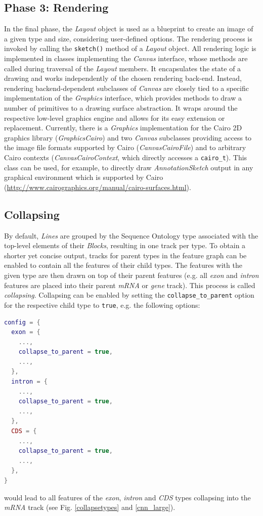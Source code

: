\documentclass[a4paper]{scrreprt}
\begin{document}
\subsection{Phase 3: Rendering}
In the final phase, the \emph{Layout} object is used as a blueprint to create an image of a given type and size, considering user-defined options. The rendering process is invoked by calling the \texttt{sketch()} method of a \emph{Layout} object. All rendering logic is implemented in classes implementing the \emph{Canvas} interface, whose methods are called during traversal of the \emph{Layout} members. It encapsulates the state of a drawing and works independently of the chosen rendering back-end. Instead, rendering backend-dependent subclasses of \emph{Canvas} are closely tied to a specific implementation of the \emph{Graphics} interface, which provides methods to draw a number of primitives to a drawing surface abstraction. It wraps around the respective low-level graphics engine and allows for its easy extension or replacement.
 Currently, there is a \emph{Graphics} implementation for the Cairo 2D graphics library (\emph{GraphicsCairo}) and two \emph{Canvas} subclasses providing access to the image file formats supported by Cairo (\emph{CanvasCairoFile}) and to arbitrary Cairo contexts (\emph{CanvasCairoContext}, which directly accesses a \texttt{cairo\_t}). This class can be used, for example, to directly draw \emph{AnnotationSketch} output in any graphical environment which is supported by Cairo (\url{http://www.cairographics.org/manual/cairo-surfaces.html}).

\subsection{Collapsing}
By default, \emph{Lines} are grouped by the Sequence Ontology type associated with the top-level elements of their \emph{Blocks}, resulting in one track per type.
To obtain a shorter yet concise output, tracks for parent types in the feature graph can be enabled to contain all the features of their child types. The features with the given type are then drawn on top of their parent features (e.g. all \emph{exon} and \emph{intron} features are placed into their parent \emph{mRNA} or \emph{gene} track). This process is called \emph{collapsing}. Collapsing can be enabled by setting the \texttt{collapse\_to\_parent} option for the respective child type to \texttt{true}, e.g. the following options:

\begin{lstlisting}[language=Lua, showstringspaces=false,numbers=none,frame=single]
config = {
  exon = {
    ...,
    collapse_to_parent = true,
    ...,
  },
  intron = {
    ...,
    collapse_to_parent = true,
    ...,
  },
  CDS = {
    ...,
    collapse_to_parent = true,
    ...,
  },
}
\end{lstlisting}
would lead to all features of the \emph{exon}, \emph{intron} and \emph{CDS} types collapsing into the \emph{mRNA} track (see Fig. \ref{collapsetypes} and \ref{cnn_large}).
\end{document}
